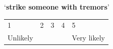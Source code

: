 \documentclass[output=paper]{langsci/langscibook}
\begin{document}
\begin{subappendices}
{\noindent \enquote*{\textbf{strike someone with tremors}}\vspace{.5\baselineskip}

\noindent \begin{tabularx}{\textwidth}{XXXXX}
        1 & 2 & 3 & 4 & 5\\
        Unlikely & & & & Very likely\\
        \end{tabularx}
}



\end{subappendices}
\end{document}
